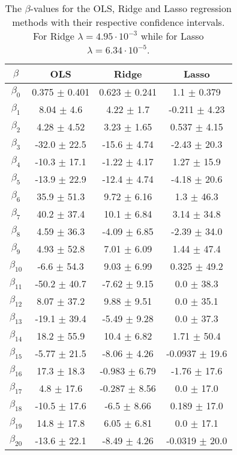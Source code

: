 \documentclass[uio,jmp,amsmath,amssymb,reprint,nofootinbib]{revtex4-1}
\numberwithin{equation}{section}
\begin{document}
\begin{table}
\begin{tabular}{|c|c|c|c|}\hline
\(\beta\) & OLS & Ridge & Lasso \\ \hline
\(\beta_{0}\) & 0.375 \(\pm\) 0.401 & 0.623 \(\pm\) 0.241 & 1.1 \(\pm\) 0.379 \\ \hline
\(\beta_{1}\) & 8.04 \(\pm\) 4.6 & 4.22 \(\pm\) 1.7 & -0.211 \(\pm\) 4.23 \\ \hline
\(\beta_{2}\) & 4.28 \(\pm\) 4.52 & 3.23 \(\pm\) 1.65 & 0.537 \(\pm\) 4.15 \\ \hline
\(\beta_{3}\) & -32.0 \(\pm\) 22.5 & -15.6 \(\pm\) 4.74 & -2.43 \(\pm\) 20.3 \\ \hline
\(\beta_{4}\) & -10.3 \(\pm\) 17.1 & -1.22 \(\pm\) 4.17 & 1.27 \(\pm\) 15.9 \\ \hline
\(\beta_{5}\) & -13.9 \(\pm\) 22.9 & -12.4 \(\pm\) 4.74 & -4.18 \(\pm\) 20.6 \\ \hline
\(\beta_{6}\) & 35.9 \(\pm\) 51.3 & 9.72 \(\pm\) 6.16 & 1.3 \(\pm\) 46.3 \\ \hline
\(\beta_{7}\) & 40.2 \(\pm\) 37.4 & 10.1 \(\pm\) 6.84 & 3.14 \(\pm\) 34.8 \\ \hline
\(\beta_{8}\) & 4.59 \(\pm\) 36.3 & -4.09 \(\pm\) 6.85 & -2.39 \(\pm\) 34.0 \\ \hline
\(\beta_{9}\) & 4.93 \(\pm\) 52.8 & 7.01 \(\pm\) 6.09 & 1.44 \(\pm\) 47.4 \\ \hline
\(\beta_{10}\) & -6.6 \(\pm\) 54.3 & 9.03 \(\pm\) 6.99 & 0.325 \(\pm\) 49.2 \\ \hline
\(\beta_{11}\) & -50.2 \(\pm\) 40.7 & -7.62 \(\pm\) 9.15 & 0.0 \(\pm\) 38.3 \\ \hline
\(\beta_{12}\) & 8.07 \(\pm\) 37.2 & 9.88 \(\pm\) 9.51 & 0.0 \(\pm\) 35.1 \\ \hline
\(\beta_{13}\) & -19.1 \(\pm\) 39.4 & -5.49 \(\pm\) 9.28 & 0.0 \(\pm\) 37.3 \\ \hline
\(\beta_{14}\) & 18.2 \(\pm\) 55.9 & 10.4 \(\pm\) 6.82 & 1.71 \(\pm\) 50.4 \\ \hline
\(\beta_{15}\) & -5.77 \(\pm\) 21.5 & -8.06 \(\pm\) 4.26 & -0.0937 \(\pm\) 19.6 \\ \hline
\(\beta_{16}\) & 17.3 \(\pm\) 18.3 & -0.983 \(\pm\) 6.79 & -1.76 \(\pm\) 17.6 \\ \hline
\(\beta_{17}\) & 4.8 \(\pm\) 17.6 & -0.287 \(\pm\) 8.56 & 0.0 \(\pm\) 17.0 \\ \hline
\(\beta_{18}\) & -10.5 \(\pm\) 17.6 & -6.5 \(\pm\) 8.66 & 0.189 \(\pm\) 17.0 \\ \hline
\(\beta_{19}\) & 14.8 \(\pm\) 17.8 & 6.05 \(\pm\) 6.81 & 0.0 \(\pm\) 17.1 \\ \hline
\(\beta_{20}\) & -13.6 \(\pm\) 22.1 & -8.49 \(\pm\) 4.26 & -0.0319 \(\pm\) 20.0 \\ \hline
\end{tabular}
\caption{The \(\beta\)-values for the OLS, Ridge and Lasso regression methods with their respective confidence intervals. For Ridge \(\lambda = 4.95\cdot 10^{-3}\) while for Lasso \(\lambda = 6.34\cdot 10^{-5}\).}
\label{tab:02}
\end{table}
\end{document}
